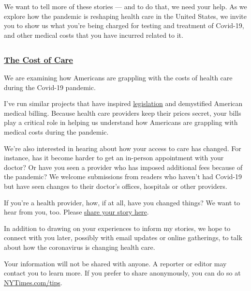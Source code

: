 We want to tell more of these stories --- and to do that, we need your
help. As we explore how the pandemic is reshaping health care in the
United States, we invite you to show us what you're being charged for
testing and treatment of Covid-19, and other medical costs that you have
incurred related to it.

\subsection{}

\hypertarget{the-cost-of-care}{%
\subsubsection{\texorpdfstring{\href{https://www.nytimes3xbfgragh.onion/spotlight/new-york-shuttered}{The
Cost of Care}}{The Cost of Care}}\label{the-cost-of-care}}

We are examining how Americans are grappling with the costs of health
care during the Covid-19 pandemic.

I've run similar projects that have inspired
\href{https://www.vox.com/2019/4/24/18514240/california-surprise-er-bills-zuckerberg}{legislation}
and demystified American medical billing. Because health care providers
keep their prices secret, your bills play a critical role in helping us
understand how Americans are grappling with medical costs during the
pandemic.

We're also interested in hearing about how your access to care has
changed. For instance, has it become harder to get an in-person
appointment with your doctor? Or have you seen a provider who has
imposed additional fees because of the pandemic? We welcome submissions
from readers who haven't had Covid-19 but have seen changes to their
doctor's offices, hospitals or other providers.

If you're a health provider, how, if at all, have you changed things? We
want to hear from you, too. Please
\href{https://www.nytimes3xbfgragh.onion/2020/08/03/reader-center/healthcare-workers-coronavirus-care.html}{share
your story here}.

In addition to drawing on your experiences to inform my stories, we hope
to connect with you later, possibly with email updates or online
gatherings, to talk about how the coronavirus is changing health care.

Your information will not be shared with anyone. A reporter or editor
may contact you to learn more. If you prefer to share anonymously, you
can do so at
\href{https://www.nytimes3xbfgragh.onion/tips}{NYTimes.com/tips}.

